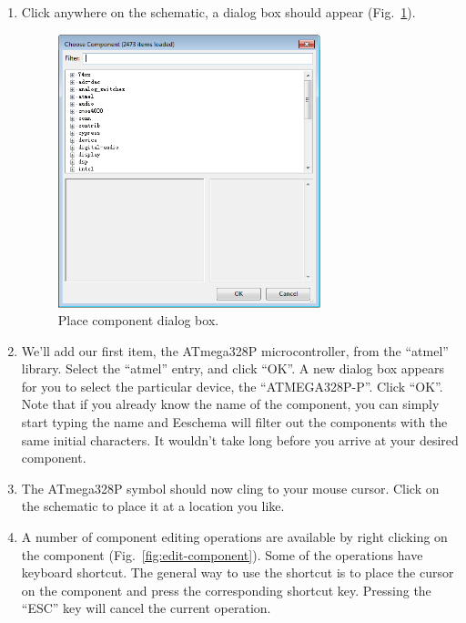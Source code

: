 \documentclass[12pt,letterpaper]{scrartcl}
\begin{document}
\begin{enumerate}
\begin{enumerate}
			\item Click anywhere on the schematic, a dialog box should appear (Fig.~\ref{fig:place-component}). 
				\begin{figure}[hp]
					\centering
					\includegraphics[width=3in]{place-component.png}
					\caption{Place component dialog box.}
					\label{fig:place-component}
				\end{figure}

			\item We'll add our first item, the ATmega328P microcontroller, from the ``atmel'' library. Select the ``atmel'' entry, and click ``OK''. A new dialog box appears for you to select the particular device, the “ATMEGA328P-P”. Click ``OK''. Note that if you already know the name of the component, you can simply start typing the name and Eeschema will filter out the components with the same initial characters. It wouldn't take long before you arrive at your desired component.
			
			\item The ATmega328P symbol should now cling to your mouse cursor. Click on the schematic to place it at a location you like. 
			\item A number of component editing operations are available by right clicking on the component (Fig.~\ref{fig:edit-component}). Some of the operations have keyboard shortcut. The general way to use the shortcut is to place the cursor on the component and press the corresponding shortcut key. Pressing the ``ESC'' key will cancel the current operation. 
			

\end{enumerate}
\end{enumerate}
\end{document}
